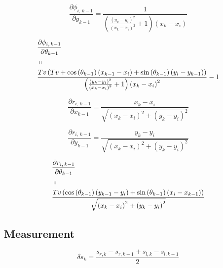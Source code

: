 \documentclass{ieeeaccess}
\begin{document}
	\begin{equation}
	\label{eq:derphiy}
		\frac{\partial \phi_{i,\,k-1}}{\partial y_{k-1}} = \frac{1}{\left(\frac{\left(y_{k}-y_{i}\right)^{2}}{\left(x_{k}-x_{i}\right)^{2}}+1\right)\left(x_{k}-x_{i}\right)}
	\end{equation}
	
	\begin{equation}
	\label{eq:derphitheta}
	\begin{aligned}
		&\frac{\partial \phi_{i,\,k-1}}{\partial \theta_{k-1}}	\\
		&\shortparallel	\\
		&\frac{Tv\left(Tv+\cos{\left(\theta_{k-1}\right)}\left(x_{k-1}-x_{i}\right)+\sin{\left(\theta_{k-1}\right)}\left(y_{i}-y_{k-1}\right)\right)}{\left(\frac{\left(y_{k}-y_{i}\right)^{2}}{\left(x_{k}-x_{i}\right)^{2}}+1\right)\left(x_{k}-x_{i}\right)^{2}}-1
	\end{aligned}
	\end{equation}
	
	\begin{equation}
	\label{eq:derrx}
		\frac{\partial r_{i,\,k-1}}{\partial x_{k-1}} = \frac{x_{k}-x_{i}}{\sqrt{\left( x_{k} - x_{i} \right)^{2}+\left( y_{k} - y_{i} \right)^{2}}}
	\end{equation}
	
	\begin{equation}
	\label{eq:derry}
		\frac{\partial r_{i,\,k-1}}{\partial y_{k-1}} = \frac{y_{k}-y_{i}}{\sqrt{\left( x_{k} - x_{i} \right)^{2}+\left( y_{k} - y_{i} \right)^{2}}}
	\end{equation}
	
	\begin{equation}
	\label{eq:derrtheta}
	\begin{aligned}
		&\frac{\partial r_{i,\,k-1}}{\partial \theta_{k-1}}	\\
		&\shortparallel	\\
		&\frac{Tv\left(\cos{\left(\theta_{k-1}\right)}\left(y_{k-1}-y_{i}\right)+\sin{\left(\theta_{k-1}\right)}\left(x_{i}-x_{k-1}\right)\right)}{\sqrt{\left( x_{k} - x_{i} \right)^{2}+\left( y_{k} - y_{i} \right)^{2}}}
	\end{aligned}
	\end{equation}

\subsection{Measurement}

	\begin{equation}
	\label{eq:delts}
		\delta s_{k} = \frac{s_{r,k} - s_{r,k-1} + s_{l,k} - s_{l,k-1}}{2}
	\end{equation}
	
\end{document}
